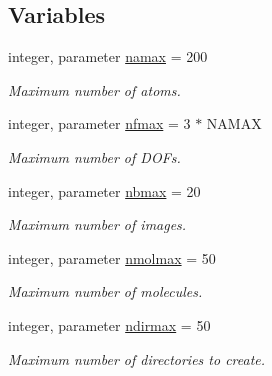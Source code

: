 \subsection*{Variables}
\begin{DoxyCompactItemize}
\item 
\mbox{\label{namespaceconstants_af3563b26c30009f026fc978080d89280}} 
integer, parameter \mbox{\hyperlink{namespaceconstants_af3563b26c30009f026fc978080d89280}{namax}} = 200
\begin{DoxyCompactList}\small\item\em Maximum number of atoms. \end{DoxyCompactList}\item 
\mbox{\label{namespaceconstants_a786ad8a0de27b7198f7a9fb33c3506f3}} 
integer, parameter \mbox{\hyperlink{namespaceconstants_a786ad8a0de27b7198f7a9fb33c3506f3}{nfmax}} = 3 $\ast$ N\+A\+M\+AX
\begin{DoxyCompactList}\small\item\em Maximum number of D\+O\+Fs. \end{DoxyCompactList}\item 
\mbox{\label{namespaceconstants_a859ea11cfca02db3a91b59b742e0303e}} 
integer, parameter \mbox{\hyperlink{namespaceconstants_a859ea11cfca02db3a91b59b742e0303e}{nbmax}} = 20
\begin{DoxyCompactList}\small\item\em Maximum number of images. \end{DoxyCompactList}\item 
\mbox{\label{namespaceconstants_ae8a3dda05015f1a60a2d4ecf50283182}} 
integer, parameter \mbox{\hyperlink{namespaceconstants_ae8a3dda05015f1a60a2d4ecf50283182}{nmolmax}} = 50
\begin{DoxyCompactList}\small\item\em Maximum number of molecules. \end{DoxyCompactList}\item 
\mbox{\label{namespaceconstants_aacae44bce0d2faf2ca80187ea4ac9ae1}} 
integer, parameter \mbox{\hyperlink{namespaceconstants_aacae44bce0d2faf2ca80187ea4ac9ae1}{ndirmax}} = 50
\begin{DoxyCompactList}\small\item\em Maximum number of directories to create. \end{DoxyCompactList}\item 

\end{DoxyCompactItemize}
